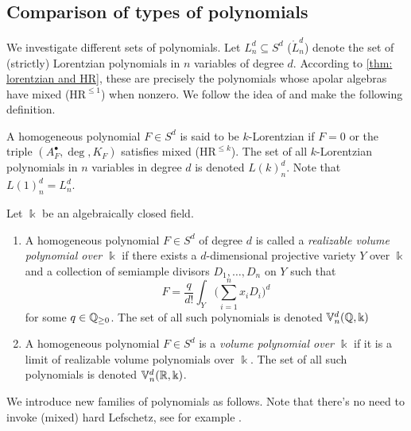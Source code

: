 \subsection{Comparison of types of polynomials}

We investigate different sets of polynomials. Let $L^d_n\subseteq S^d$ ($\mathring{L}^d_n$) denote the set of (strictly) Lorentzian polynomials in $n$ variables of degree $d$. According to \cref{thm: lorentzian and HR}, these are precisely the polynomials whose apolar algebras have mixed ($\text{HR}^{\leq 1}$) when nonzero. We follow the idea of \cite{MMS25} and make the following definition.

\begin{definition}
    A homogeneous polynomial $F\in S^d$ is said to be $k$-Lorentzian if $F=0$ or the triple $(A^\bullet_F,\deg,K_F)$ satisfies mixed ($\text{HR}^{\leq k}$). The set of all $k$-Lorentzian polynomials in $n$ variables in degree $d$ is denoted $L(k)^d_n$. Note that $L(1)^d_n=L^d_n$.
\end{definition}

\begin{definition}
    Let $\Bbbk$ be an algebraically closed field.
    \begin{enumerate}
        \item A homogeneous polynomial $F\in S^d$ of degree $d$ is called a \textit{realizable volume polynomial over $\Bbbk$} if there exists a $d$-dimensional projective variety $Y$ over $\Bbbk$ and a collection of semiample divisors $D_1,\ldots,D_n$ on $Y$ such that
    \[
        F=\frac{q}{d!}\int_Y\bigg(\sum_{i=1}^nx_iD_i\bigg)^d
    \]
    for some $q\in\mathbb{Q}_{\geq 0}$. The set of all such polynomials is denoted $\Bbb V^d_n(\mathbb{Q},\Bbbk)$
        \item A homogeneous polynomial $F\in S^d$ is a \textit{volume polynomial over $\Bbbk$} if it is a limit of realizable volume polynomials over $\Bbbk$. The set of all such polynomials is denoted $\Bbb V^d_n(\mathbb{R},\Bbbk)$.
    \end{enumerate}
\end{definition}

We introduce new families of polynomials as follows. Note that there's no need to invoke (mixed) hard Lefschetz, see for example \cite[Lemma 2.10]{MMS25}.

